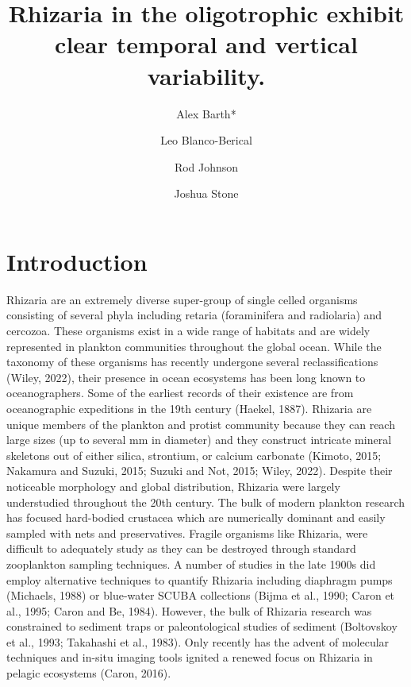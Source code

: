 \documentclass[
  letterpaper,
  DIV=11,
  numbers=noendperiod]{scrartcl}
\title{Rhizaria in the oligotrophic exhibit clear temporal and vertical
variability.}
\author{Alex Barth* \and Leo Blanco-Berical \and Rod Johnson \and Joshua
Stone}
\date{}
\begin{document}
\maketitle
\ifdefined\Shaded\renewenvironment{Shaded}{\begin{tcolorbox}[frame hidden, interior hidden, boxrule=0pt, enhanced, borderline west={3pt}{0pt}{shadecolor}, sharp corners, breakable]}{\end{tcolorbox}}\fi

\hypertarget{introduction}{%
\section{Introduction}\label{introduction}}

Rhizaria are an extremely diverse super-group of single celled organisms
consisting of several phyla including retaria (foraminifera and
radiolaria) and cercozoa. These organisms exist in a wide range of
habitats and are widely represented in plankton communities throughout
the global ocean. While the taxonomy of these organisms has recently
undergone several reclassifications (Wiley, 2022), their presence in
ocean ecosystems has been long known to oceanographers. Some of the
earliest records of their existence are from oceanographic expeditions
in the 19th century (Haekel, 1887). Rhizaria are unique members of the
plankton and protist community because they can reach large sizes (up to
several mm in diameter) and they construct intricate mineral skeletons
out of either silica, strontium, or calcium carbonate (Kimoto, 2015;
Nakamura and Suzuki, 2015; Suzuki and Not, 2015; Wiley, 2022). Despite
their noticeable morphology and global distribution, Rhizaria were
largely understudied throughout the 20th century. The bulk of modern
plankton research has focused hard-bodied crustacea which are
numerically dominant and easily sampled with nets and preservatives.
Fragile organisms like Rhizaria, were difficult to adequately study as
they can be destroyed through standard zooplankton sampling techniques.
A number of studies in the late 1900s did employ alternative techniques
to quantify Rhizaria including diaphragm pumps (Michaels, 1988) or
blue-water SCUBA collections (Bijma et al., 1990; Caron et al., 1995;
Caron and Be, 1984). However, the bulk of Rhizaria research was
constrained to sediment traps or paleontological studies of sediment
(Boltovskoy et al., 1993; Takahashi et al., 1983). Only recently has the
advent of molecular techniques and in-situ imaging tools ignited a
renewed focus on Rhizaria in pelagic ecosystems (Caron, 2016).
\end{document}
